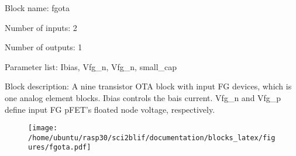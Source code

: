 \pagebreak

Block name: fgota

Number of inputs: 2

Number of outputs: 1

Parameter list: Ibias, Vfg\_n, Vfg\_n, small\_cap

Block description: 
A nine transistor OTA block with input FG devices, which is one analog element blocks. Ibias controls the bais current. Vfg\_n and Vfg\_p define input FG pFET's floated node voltage, respectively.

\begin{figure}[H]  %
\texttt{[image: /home/ubuntu/rasp30/sci2blif/documentation/blocks\_latex/figures/fgota.pdf]}
\end{figure}

